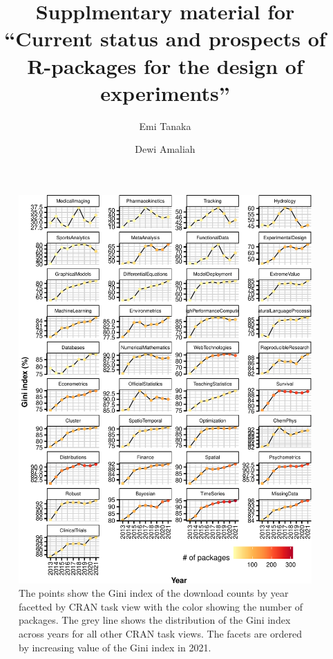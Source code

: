 \documentclass[
]{article}
\title{Supplmentary material for ``Current status and prospects of R-packages for the design of experiments''}
\author{Emi Tanaka \and Dewi Amaliah}
\date{}
\begin{document}
\maketitle

\begin{figure}[htbp]

{\centering \includegraphics{figures/fig-gini-all-ctvs-1} 

}

\caption{The points show the Gini index of the download counts by year facetted by CRAN task view with the color showing the number of packages. The grey line shows the distribution of the Gini index across years for all other CRAN task views. The facets are ordered by increasing value of the Gini index in 2021.}\label{fig:fig-gini-all-ctvs}
\end{figure}
\end{document}
